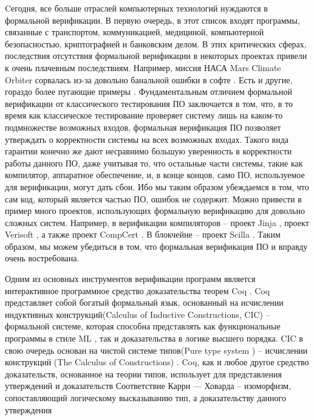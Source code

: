 Cегодня, все больше отраслей компьютерных технологий нуждаются в формальной верификации. В первую очередь, в этот список входят программы,
связанные с транспортом, коммуникацией, медициной, компьютерной безопасностью, криптографией и банковским делом.
В этих критических сферах,
последствия отсутствия формальной верификации в некоторых проектах привели к очень плачевным последствиям. Например, миссия НАСА Mars Climate Orbiter
сорвалась из-за довольно банальной ошибки в софте \cite{horror}. Есть и другие, гораздо более пугающие примеры \cite{horror}.
Фундаментальным отличием формальной верификации от классического тестирования ПО заключается в том, что, в то время как классическое
тестирование проверяет систему лишь на каком-то подмножестве возможных входов, формальная верификация ПО позволяет утверждать о
корректности системы на всех возможных входах. Такого вида гарантии конечно же дают несравнимо большую уверенность в корректности
работы данного ПО, даже учитывая то, что остальные части системы, такие как компилятор, аппаратное обеспечение, и,
в конце концов, само ПО, используемое для верификации, могут дать сбои. Ибо мы таким образом убеждаемся в том, что сам код, который
является частью ПО, ошибок не содержит. Можно привести в пример много проектов, использующих формальную верификацию для довольно сложных
систем. Например, в верификации компиляторов -- проект Jinja \cite{KleinN-TCS,KleinN-ACM}, проект Verisoft
\cite{Strecker_compilerverification,Leinenbach}, а также проект CompCert \cite{Xavier,CompCert}.
В блокчейне -- проект Scilla \cite{sergey2018scilla}. Таким образом, мы можем убедиться в том, что формальная верификация ПО
и вправду очень востребована.
\par
Одним из основных инструментов верификации программ является интерактивное программное средство доказательства теорем Coq
\cite{the_coq_development_team_2021_4501022}. Coq представляет собой богатый формальный язык, основанный на
исчислении индуктивных конструкций(Calculus of Inductive Constructions, CIC) \cite{CIC} -- формальной системе, которая способна
представлять как функциональные программы в стиле ML \cite{ML-lang}, так и доказательства в логике высшего порядка. CIC в свою
очередь основан на чистой системе типов(Pure type system \cite{PTS}) -- исчислении конструкций (The Calculus of Constructions) \cite{CalculusOfConstructions}.
Coq, как и любое другое средство доказательств, основанное на теории типов, использует для представления утверждений и доказательств
Соответствие Карри — Ховарда \cite{CurryHowardIsom} -- изоморфизм, сопоставляющий логическому высказыванию тип, а доказательству данного утверждения
